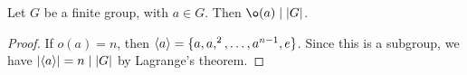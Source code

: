 \begin{corollary}
    Let $G$ be a finite group, with $a \in G$. Then $\o(a) \mid \abs{G}$.
\end{corollary}

\begin{proof}
    If $o(a) = n$, then $\langle a\rangle = \{a,a,^{2},\ldots,a^{n-1},e\}$. Since this is a subgroup, we have $\left| \langle a\rangle \right| = n \mid \left| G \right|$ by Lagrange's theorem.
\end{proof}